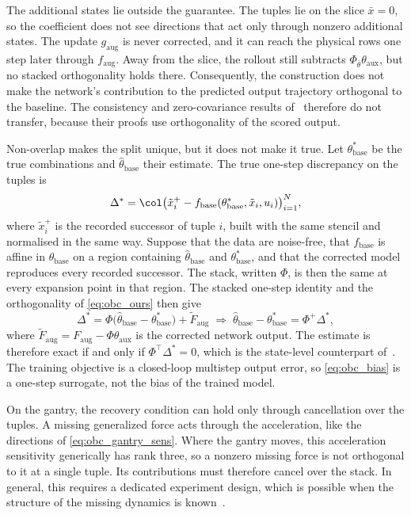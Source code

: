 The additional states lie outside the guarantee.
The tuples lie on the slice $\bar x=0$, so the coefficient does not see
directions that act only through nonzero additional states.
The update $g_{\mathrm{aug}}$ is never corrected, and it can reach the
physical rows one step later through $f_{\mathrm{aug}}$.
Away from the slice, the rollout still subtracts
$\Phi_{\bar\theta}\theta_{\mathrm{aux}}$, but no stacked orthogonality holds
there.
Consequently, the construction does not make the network's contribution to
the predicted output trajectory orthogonal to the baseline.
The consistency and zero-covariance results
of~\cite[Thms.~16, 18]{gyorok2026obc} therefore do not transfer, because
their proofs use orthogonality of the scored output.

Non-overlap makes the split unique, but it does not make it true.
Let $\theta^*_{\mathrm{base}}$ be the true combinations and
$\hat\theta_{\mathrm{base}}$ their estimate.
The true one-step discrepancy on the tuples is
\begin{equation}
 \Delta^*=\col\bigl(\tilde x_i^{+}-f_{\mathrm{base}}(\theta^*_{\mathrm{base}},
 \tilde x_i,u_i)\bigr)_{i=1}^{N},
\label{eq:obc_delta}
\end{equation}
where $\tilde x_i^{+}$ is the recorded successor of tuple $i$, built with the
same stencil and normalised in the same way.
Suppose that the data are noise-free, that $f_{\mathrm{base}}$ is affine in
$\theta_{\mathrm{base}}$ on a region containing $\hat\theta_{\mathrm{base}}$
and $\theta^*_{\mathrm{base}}$, and that the corrected model reproduces every
recorded successor.
The stack, written $\Phi$, is then the same at every expansion point in
that region.
The stacked one-step identity and the orthogonality of \eqref{eq:obc_ours}
then give
\begin{equation}
 \Delta^*=\Phi\bigl(\hat\theta_{\mathrm{base}}-\theta^*_{\mathrm{base}}\bigr)
 +\widetilde F_{\mathrm{aug}}
 \;\Longrightarrow\;
 \hat\theta_{\mathrm{base}}-\theta^*_{\mathrm{base}}=\Phi^{+}\Delta^*,
\label{eq:obc_bias}
\end{equation}
where $\widetilde F_{\mathrm{aug}}=F_{\mathrm{aug}}-\Phi\theta_{\mathrm{aux}}$
is the corrected network output.
The estimate is therefore exact if and only if $\Phi^\top\Delta^*=0$, which
is the state-level counterpart of~\cite[Cond.~4, Thm.~7]{gyorok2026obc}.
The training objective is a closed-loop multistep output error, so
\eqref{eq:obc_bias} is a one-step surrogate, not the bias of the trained
model.

On the gantry, the recovery condition can hold only through cancellation
over the tuples.
A missing generalized force acts through the acceleration, like the
directions of \eqref{eq:obc_gantry_sens}.
Where the gantry moves, this acceleration sensitivity generically has rank
three, so a nonzero missing force is not orthogonal to it at a single tuple.
Its contributions must therefore cancel over the stack.
In general, this requires a dedicated experiment design, which is possible
when the structure of the missing dynamics is
known~\cite[Sec.~4.1, Remark~5]{gyorok2026obc}.

